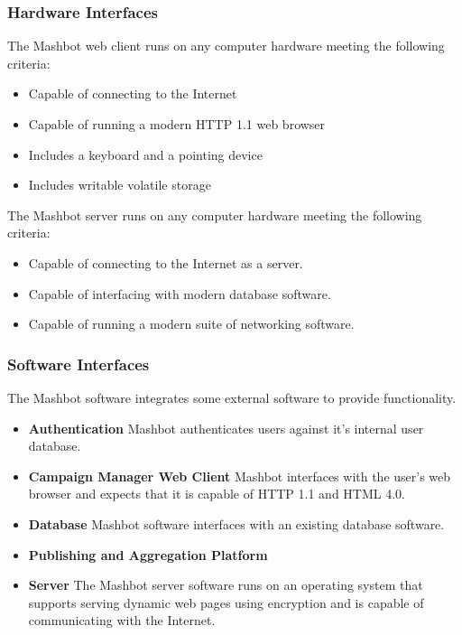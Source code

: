 \documentclass{report}
\begin{document}
		\subsubsection{Hardware Interfaces} %
                The Mashbot web client runs on any computer hardware meeting
                the following criteria:
                \begin{itemize}
                  \item Capable of connecting to the Internet
                  \item Capable of running a modern HTTP 1.1 web browser
                  \item Includes a keyboard and a pointing device
                  \item Includes writable volatile storage
                \end{itemize}
                The Mashbot server runs on any computer hardware meeting
                the following criteria:
                \begin{itemize}
                \item Capable of connecting to the Internet as a server.
                \item Capable of interfacing with modern database software.
                \item Capable of running a modern suite of networking software.
		\end{itemize}

		\subsubsection{Software Interfaces} %
                The Mashbot software integrates some external software
                to provide functionality.
                \begin{itemize}
                \item \textbf{Authentication} Mashbot authenticates users
                  against it's internal user database.
                \item \textbf{Campaign Manager Web Client} Mashbot
                  interfaces with the user’s web browser and expects
                  that it is capable of HTTP 1.1 and HTML 4.0.
                \item \textbf{Database} Mashbot software interfaces
                  with an existing database software.
                  \item \textbf{Publishing and Aggregation Platform}
                \item \textbf{Server} The Mashbot server software runs
                  on an operating system that supports serving dynamic
                  web pages using encryption and is capable of
                  communicating with the Internet.
                \end{itemize}
\end{document}
